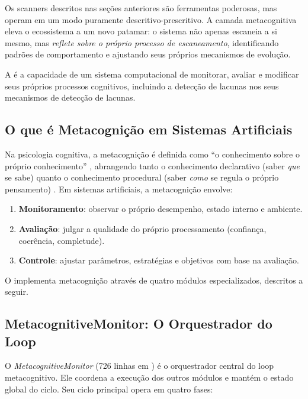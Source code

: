 Os scanners descritos nas seções anteriores são ferramentas poderosas, mas
operam em um modo puramente descritivo-prescritivo. A camada metacognitiva
eleva o ecossistema a um novo patamar: o sistema não apenas escaneia a si
mesmo, mas \emph{reflete sobre o próprio processo de escaneamento},
identificando padrões de comportamento e ajustando seus próprios mecanismos
de evolução.

\begin{definicao}
A  é a capacidade de um sistema
computacional de monitorar, avaliar e modificar seus próprios processos
cognitivos, incluindo a detecção de lacunas nos seus mecanismos de
detecção de lacunas.
\end{definicao}

\subsection{O que é Metacognição em Sistemas Artificiais}

Na psicologia cognitiva, a metacognição é definida como ``o conhecimento
sobre o próprio conhecimento'' \cite{flavell1976metacognitive},
abrangendo tanto o conhecimento declarativo (saber \emph{que} se sabe)
quanto o conhecimento procedural (saber \emph{como} se regula o
próprio pensamento) \cite{schraw2006metacognitive}. Em sistemas
artificiais, a metacognição envolve:

\begin{enumerate}
\item \textbf{Monitoramento}: observar o próprio desempenho, estado interno
e ambiente.
\item \textbf{Avaliação}: julgar a qualidade do próprio processamento
(confiança, coerência, completude).
\item \textbf{Controle}: ajustar parâmetros, estratégias e objetivos com
base na avaliação.
\end{enumerate}

O \opencodeeco{} implementa metacognição através de quatro módulos
especializados, descritos a seguir.

\subsection{MetacognitiveMonitor: O Orquestrador do Loop}

O \emph{MetacognitiveMonitor} (726 linhas em )
é o orquestrador central do loop metacognitivo. Ele coordena a execução
dos outros módulos e mantém o estado global do ciclo. Seu ciclo principal
opera em quatro fases:

